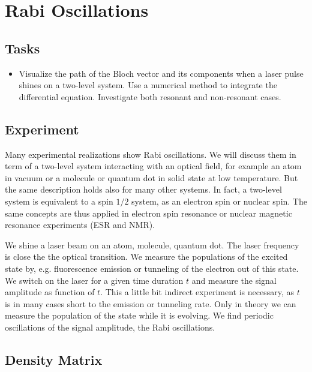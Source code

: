 

\chapter{Rabi Oscillations}



\section{Tasks}

\begin{itemize}
\item  Visualize the  path of the Bloch vector and its components when a laser pulse shines on a two-level system. Use a numerical method to integrate the differential equation. Investigate both resonant and non-resonant cases.
\end{itemize}



\section{Experiment}

Many experimental realizations show Rabi oscillations. We will discuss them in term of a two-level system interacting with an optical field, for example an atom in vacuum or a molecule or quantum dot in solid state at low temperature. But the same description holds also for many other systems. In fact, a two-level system is equivalent to a spin $1/2$ system, as an electron spin or nuclear spin. The same concepts are thus applied in electron spin resonance or nuclear magnetic resonance experiments (ESR and NMR).

We shine a laser beam on an atom, molecule, quantum dot. The laser frequency is close the the optical transition. We measure the populations of the excited state by, e.g. fluorescence emission or tunneling of the electron out of this state. We switch on the laser for a given time duration $t$ and measure the signal amplitude as function of $t$. This a little bit indirect experiment is necessary, as $t$ is in many cases short to the emission or tunneling rate. Only in theory we can measure the population of the state while it is evolving. We find periodic oscillations of the signal amplitude, the Rabi oscillations.

\section{Density Matrix}


